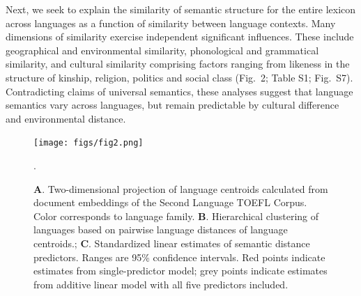 \documentclass[9pt,twocolumn,twoside,lineno]{pnas-new}
\begin{document}
Next, we seek to explain the similarity of semantic structure for the entire lexicon across languages as a function of similarity between language contexts. Many dimensions of similarity exercise independent significant influences. These include geographical and environmental similarity, phonological and grammatical similarity, and cultural similarity comprising factors ranging from likeness in the structure of kinship, religion, politics and social class (Fig.\ 2; Table S1; Fig.\ S7). Contradicting claims of universal semantics, these analyses suggest that language semantics vary across languages, but remain predictable by cultural difference and environmental distance. 

\begin{figure}[t!]
\centering
\texttt{[image: figs/fig2.png]}
\caption{{\textbf A.} Two-dimensional projection of language centroids calculated from  document embeddings of the Second Language TOEFL Corpus. Color corresponds to language family. {\textbf B.} Hierarchical clustering of languages based on pairwise language distances of language centroids.; {\textbf C.} Standardized linear estimates of semantic distance predictors. Ranges are 95\% confidence intervals. Red points indicate estimates from single-predictor model; grey points indicate estimates from additive linear model with all five predictors included.}.
\label{fig:fig2} 
\end{figure}



\end{document}
